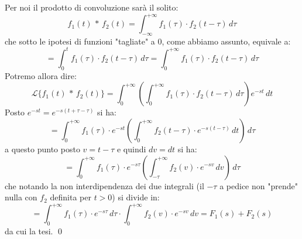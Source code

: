 \documentclass[a4paper,11pt]{article}
\begin{document}
Per noi il prodotto di convoluzione sarà il solito:
$$
f_1(t) \, * \, f_2(t) = \int_{-\infty}^{+ \infty} f_1(\tau) \cdot f_2(t - \tau) \, d\tau
$$
che sotto le ipotesi di funzioni "tagliate" a 0, come abbiamo assunto, equivale a:
$$
= \int_0^t f_1(\tau) \cdot f_2(t - \tau) \, d\tau = \int_0^{+\infty} f_1(\tau) \cdot f_2(t - \tau) \, d\tau
$$
Potremo allora dire:
$$
\mathcal{L} \{ f_1(t) \, * \, f_2(t) \} = \int_0^{+\infty} \left( \int_0^{+ \infty} f_1(\tau) \cdot f_2(t - \tau) \, d\tau \right) e^{-st} \, dt
$$
Posto $e^{-st} = e^{-s(t + \tau - \tau)}$ si ha:
$$
= \int_0^{+\infty} f_1(\tau) \cdot e^{-st} \left( \int_0^{+\infty} f_2(t - \tau) \cdot e^{-s(t - \tau)} \, dt \right) \, d\tau
$$
a questo punto posto $v = t - \tau$ e quindi $dv = dt$ si ha:
$$
= \int_0^{+\infty} f_1(\tau) \cdot e^{- s \tau} \left( \int_{-\tau}^{+\infty} f_2(v) \cdot e^{-sv} \, dv \right) \, d\tau
$$
che notando la non interdipendenza dei due integrali (il $-\tau$ a pedice non "prende" nulla con $f_2$ definita per $t > 0$) si divide in:
$$
= \int_0^{+\infty} f_1(\tau) \cdot e^{- s \tau} \, d\tau \cdot \int_0^{+\infty} f_2(v) \cdot e^{-sv} \, dv = F_1(s) + F_2(s)
$$
da cui la tesi. \qed
\end{document}
